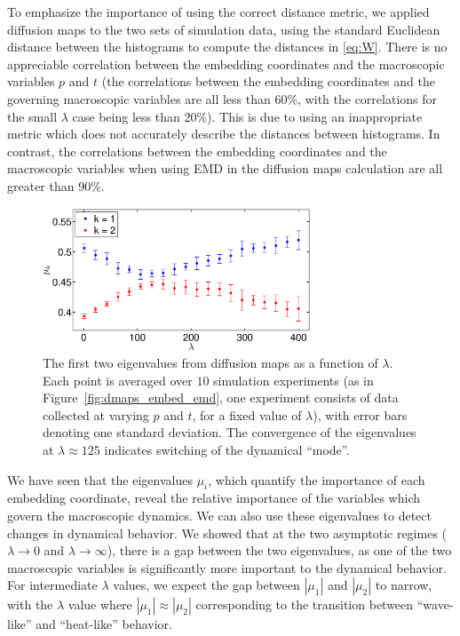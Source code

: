 \documentclass[prl, reprint]{revtex4-1}
\begin{document}
To emphasize the importance of using the correct distance metric, we applied diffusion maps to the two sets of simulation data, using the standard Euclidean distance between the histograms to compute the distances in \eqref{eq:W}.
%
There is no appreciable correlation between the embedding coordinates and the macroscopic variables $p$ and $t$ (the correlations between the embedding coordinates and the governing macroscopic variables are all  less than 60\%, with the correlations for the small $\lambda$ case being less than 20\%). 
%
This is due to using an inappropriate metric which does not accurately describe the distances between histograms.
%
In contrast, the correlations between the embedding coordinates and the macroscopic variables when using EMD in the diffusion maps calculation are all greater than 90\%.



\begin{figure}[t] 
\includegraphics[width=8cm]{detect_change_eigenvalues}
\caption{The first two eigenvalues from diffusion maps as a function of $\lambda$. Each point is averaged over $10$ simulation experiments (as in Figure~\ref{fig:dmaps_embed_emd}, one experiment consists of data collected at varying $p$ and $t$, for a fixed value of $\lambda$), with error bars denoting one standard deviation. 
The convergence of the eigenvalues at $\lambda \approx 125$ indicates switching of the dynamical ``mode''.}
\label{fig:detect_change}
\end{figure}

We have seen that the eigenvalues $\mu_i$, which quantify the importance of each embedding coordinate, reveal the relative importance of the variables which govern the macroscopic dynamics.
%
We can also use these eigenvalues to detect changes in dynamical behavior.
%
We showed that at the two asymptotic regimes ($\lambda \rightarrow 0$ and $\lambda \rightarrow \infty$), there is a gap between the two eigenvalues, as one of the two macroscopic variables is significantly more important to the dynamical behavior.
%
For intermediate $\lambda$ values, we expect the gap between $|\mu_1|$ and $|\mu_2|$ to narrow, with the $\lambda$ value where $|\mu_1| \approx |\mu_2|$ corresponding to the transition between ``wave-like'' and ``heat-like'' behavior. 
\end{document}
